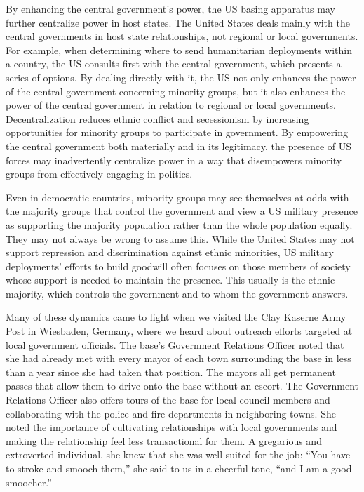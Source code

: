 By enhancing the central government's power, the US basing apparatus may further centralize power in host states. The United States deals mainly with the central governments in host state relationships, not regional or local governments. For example, when determining where to send humanitarian deployments within a country, the US consults first with the central government, which presents a series of options.\cite{Flynn2018} By dealing directly with it, the US not only enhances the power of the central government concerning minority groups, but it also enhances the power of the central government in relation to regional or local governments. Decentralization reduces ethnic conflict and secessionism by increasing opportunities for minority groups to participate in government.\cite{Brancati2006} By empowering the central government both materially and in its legitimacy, the presence of US forces may inadvertently centralize power in a way that disempowers minority groups from effectively engaging in politics. 

Even in democratic countries, minority groups may see themselves at odds with the majority groups that control the government and view a US military presence as supporting the majority population rather than the whole population equally. They may not always be wrong to assume this. While the United States may not support repression and discrimination against ethnic minorities, US military deployments' efforts to build goodwill often focuses on those members of society whose support is needed to maintain the presence. This usually is the ethnic majority, which controls the government and to whom the government answers.

Many of these dynamics came to light when we visited the Clay Kaserne Army Post in Wiesbaden, Germany, where we heard about outreach efforts targeted at local government officials. The base's Government Relations Officer noted that she had already met with every mayor of each town surrounding the base in less than a year since she had taken that position. The mayors all get permanent passes that allow them to drive onto the base without an escort. The Government Relations Officer also offers tours of the base for local council members and collaborating with the police and fire departments in neighboring towns. She noted the importance of cultivating relationships with local governments and making the relationship feel less transactional for them. A gregarious and extroverted individual, she knew that she was well-suited for the job: ``You have to stroke and smooch them,'' she said to us in a cheerful tone, ``and I am a good smoocher.''\cite{kaserneone20190725}   

